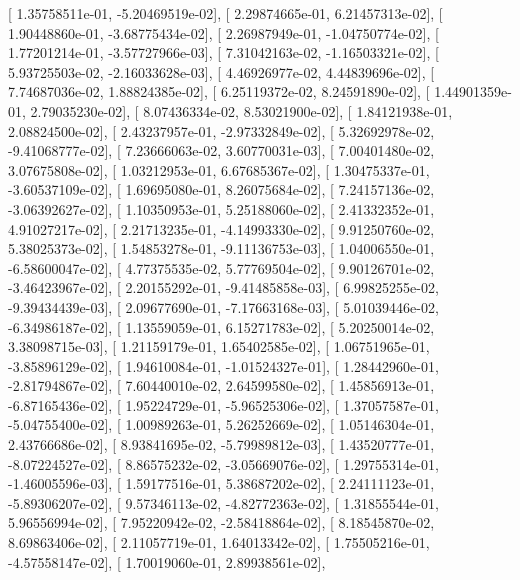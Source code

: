 \documentclass{article}
\begin{document}
       [  1.35758511e-01,  -5.20469519e-02],
       [  2.29874665e-01,   6.21457313e-02],
       [  1.90448860e-01,  -3.68775434e-02],
       [  2.26987949e-01,  -1.04750774e-02],
       [  1.77201214e-01,  -3.57727966e-03],
       [  7.31042163e-02,  -1.16503321e-02],
       [  5.93725503e-02,  -2.16033628e-03],
       [  4.46926977e-02,   4.44839696e-02],
       [  7.74687036e-02,   1.88824385e-02],
       [  6.25119372e-02,   8.24591890e-02],
       [  1.44901359e-01,   2.79035230e-02],
       [  8.07436334e-02,   8.53021900e-02],
       [  1.84121938e-01,   2.08824500e-02],
       [  2.43237957e-01,  -2.97332849e-02],
       [  5.32692978e-02,  -9.41068777e-02],
       [  7.23666063e-02,   3.60770031e-03],
       [  7.00401480e-02,   3.07675808e-02],
       [  1.03212953e-01,   6.67685367e-02],
       [  1.30475337e-01,  -3.60537109e-02],
       [  1.69695080e-01,   8.26075684e-02],
       [  7.24157136e-02,  -3.06392627e-02],
       [  1.10350953e-01,   5.25188060e-02],
       [  2.41332352e-01,   4.91027217e-02],
       [  2.21713235e-01,  -4.14993330e-02],
       [  9.91250760e-02,   5.38025373e-02],
       [  1.54853278e-01,  -9.11136753e-03],
       [  1.04006550e-01,  -6.58600047e-02],
       [  4.77375535e-02,   5.77769504e-02],
       [  9.90126701e-02,  -3.46423967e-02],
       [  2.20155292e-01,  -9.41485858e-03],
       [  6.99825255e-02,  -9.39434439e-03],
       [  2.09677690e-01,  -7.17663168e-03],
       [  5.01039446e-02,  -6.34986187e-02],
       [  1.13559059e-01,   6.15271783e-02],
       [  5.20250014e-02,   3.38098715e-03],
       [  1.21159179e-01,   1.65402585e-02],
       [  1.06751965e-01,  -3.85896129e-02],
       [  1.94610084e-01,  -1.01524327e-01],
       [  1.28442960e-01,  -2.81794867e-02],
       [  7.60440010e-02,   2.64599580e-02],
       [  1.45856913e-01,  -6.87165436e-02],
       [  1.95224729e-01,  -5.96525306e-02],
       [  1.37057587e-01,  -5.04755400e-02],
       [  1.00989263e-01,   5.26252669e-02],
       [  1.05146304e-01,   2.43766686e-02],
       [  8.93841695e-02,  -5.79989812e-03],
       [  1.43520777e-01,  -8.07224527e-02],
       [  8.86575232e-02,  -3.05669076e-02],
       [  1.29755314e-01,  -1.46005596e-03],
       [  1.59177516e-01,   5.38687202e-02],
       [  2.24111123e-01,  -5.89306207e-02],
       [  9.57346113e-02,  -4.82772363e-02],
       [  1.31855544e-01,   5.96556994e-02],
       [  7.95220942e-02,  -2.58418864e-02],
       [  8.18545870e-02,   8.69863406e-02],
       [  2.11057719e-01,   1.64013342e-02],
       [  1.75505216e-01,  -4.57558147e-02],
       [  1.70019060e-01,   2.89938561e-02],
\end{document}
